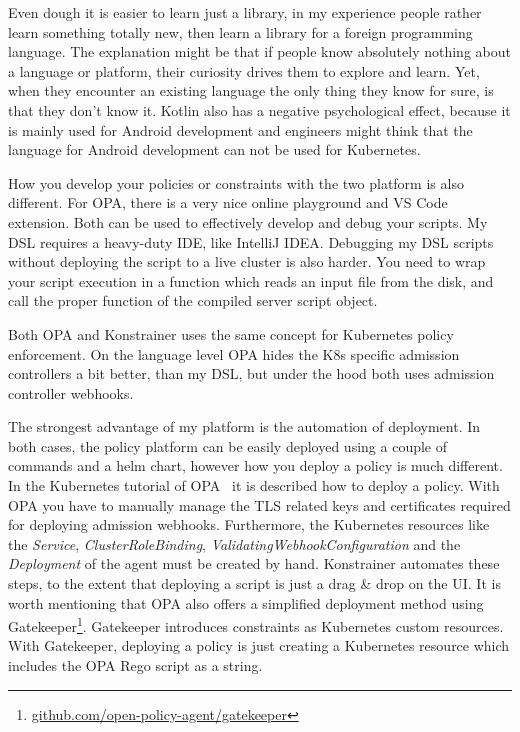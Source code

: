 Even dough it is easier to learn just a library, in my experience people rather learn something totally new, then learn a library for a foreign programming language. The explanation might be that if people know absolutely nothing about a language or platform, their curiosity drives them to explore and learn. Yet, when they encounter an existing language the only thing they know for sure, is that they don't know it. Kotlin also has a negative psychological effect, because it is mainly used for Android development and engineers might think that the language for Android development can not be used for Kubernetes.

How you develop your policies or constraints with the two platform is also different. For OPA, there is a very nice online playground and VS Code extension. Both can be used to effectively develop and debug your scripts. My DSL requires a heavy-duty IDE, like IntelliJ IDEA. Debugging my DSL scripts without deploying the script to a live cluster is also harder. You need to wrap your script execution in a function which reads an input file from the disk, and call the proper function of the compiled server script object.

Both OPA and Konstrainer uses the same concept for Kubernetes policy enforcement. On the language level OPA hides the K8s specific admission controllers a bit better, than my DSL, but under the hood both uses admission controller webhooks.

The strongest advantage of my platform is the automation of deployment. In both cases, the policy platform can be easily deployed using a couple of commands and a helm chart, however how you deploy a policy is much different. In the Kubernetes tutorial of OPA~\cite{OPA} it is described how to deploy a policy. With OPA you have to manually manage the TLS related keys and certificates required for deploying admission webhooks. Furthermore, the Kubernetes resources like the \emph{Service}, \emph{ClusterRoleBinding}, \emph{ValidatingWebhookConfiguration} and the \emph{Deployment} of the agent must be created by hand. Konstrainer automates these steps, to the extent that deploying a script is just a drag \& drop on the UI. It is worth mentioning that OPA also offers a simplified deployment method using Gatekeeper\footnote{\url{github.com/open-policy-agent/gatekeeper}}. Gatekeeper introduces constraints as Kubernetes custom resources. With Gatekeeper, deploying a policy is just creating a Kubernetes resource which includes the OPA Rego script as a string.


